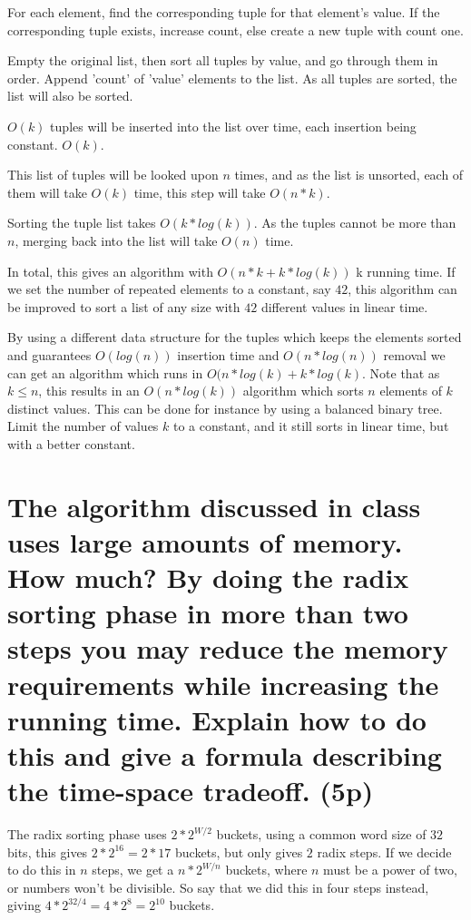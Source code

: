 \documentclass[a4paper,10pt,titlepage]{article}
\begin{document}
For each element, find the corresponding tuple for that element's value. If the corresponding tuple exists, increase count, else create a new tuple with count one.

Empty the original list, then sort all tuples by value, and go through them in order. Append 'count' of 'value' elements to the list. As all tuples are sorted, the list will also be sorted.

$O(k)$ tuples will be inserted into the list over time, each insertion being constant. $O(k)$.

This list of tuples will be looked upon $n$ times, and as the list is unsorted, each of them will take $O(k)$ time, this step will take $O(n*k)$.

Sorting the tuple list takes $O(k*log(k))$. As the tuples cannot be more than $n$, merging back into the list will take $O(n)$ time.

In total, this gives an algorithm with $O(n*k + k*log(k))$ k running time. If we set the number of repeated elements to a constant, say $42$, this algorithm can be improved to sort a list of any size with $42$ different values in linear time.

By using a different data structure for the tuples which keeps the elements sorted and guarantees $O(log(n))$ insertion time and $O(n*log(n))$ removal we can get an algorithm which runs in $O(n*log(k) + k*log(k)$. Note that as $k \leq n$, this results in an $O(n*log(k))$ algorithm which sorts $n$ elements of $k$ distinct values. This can be done for instance by using a balanced binary tree. Limit the number of values $k$ to a constant, and it still sorts in linear time, but with a better constant.

\section {The algorithm discussed in class uses large amounts of memory. How much? By doing the radix sorting phase in more than two steps you may reduce the memory requirements while increasing the running time. Explain how to do this and give a formula describing the time-space tradeoff. (5p)}

The radix sorting phase uses $2*2^{W/2}$ buckets, using a common word size of $32$ bits, this gives $2*2^{16} = 2*17$ buckets, but only gives $2$ radix steps. If we decide to do this in $n$ steps, we get a $n*2^{W/n}$ buckets, where $n$ must be a power of two, or numbers won't be divisible. So say that we did this in four steps instead, giving $4*2^{32/4} = 4*2^{8} = 2^{10}$ buckets. 
\end{document}

